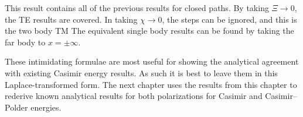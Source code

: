 This result contains all of the previous results for closed paths.  By taking $\Xi\rightarrow 0$, the TE results are covered.
In taking $\chi\rightarrow 0$, the steps can be ignored, and this is the two body TM 
The equivalent single body results can be found by taking the far body to $x=\pm\infty$.  

These intimidating formulae are most useful for showing the analytical agreement with existing 
Casimir energy results.  As such it is best to leave them in this Laplace-transformed form.  
The next chapter uses the results from this chapter to rederive known analytical results for both 
polarizations for Casimir and Casimir--Polder energies.  

